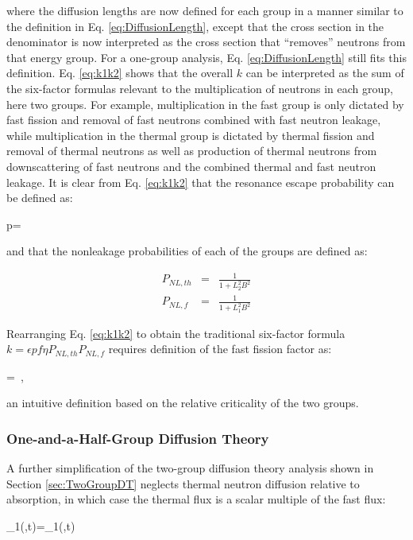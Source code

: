 where the diffusion lengths are now defined for each group in a manner similar to the definition in Eq. \eqref{eq:DiffusionLength}, except that the cross section in the denominator is now interpreted as the cross section that ``removes'' neutrons from that energy group. For a one-group analysis, Eq. \eqref{eq:DiffusionLength} still fits this definition. Eq. \eqref{eq:k1k2} shows that the overall \(k\) can be interpreted as the sum of the six-factor formulas relevant to the multiplication of neutrons in each group, here two groups. For example, multiplication in the fast group is only dictated by fast fission and removal of fast neutrons combined with fast neutron leakage, while multiplication in the thermal group is dictated by thermal fission and removal of thermal neutrons as well as production of thermal neutrons from downscattering of fast neutrons and the combined thermal and fast neutron leakage. It is clear from Eq. \eqref{eq:k1k2} that the resonance escape probability can be defined as:

\beq
p=
\eeq

and that the nonleakage probabilities of each of the groups are defined as:

\begin{subequations}
\begin{eqnarray}
P_{NL,th}&=&\frac{1}{1+L_2^2B^2}\\
P_{NL,f}&=&\frac{1}{1+L_1^2B^2}
\end{eqnarray}
\end{subequations}

Rearranging Eq. \eqref{eq:k1k2} to obtain the traditional six-factor formula \(k=\epsilon pf\eta P_{NL,th}P_{NL,f}\) requires definition of the fast fission factor as:

\beq
\epsilon=\ ,
\eeq

an intuitive definition based on the relative criticality of the two groups.

\subsubsection{One-and-a-Half-Group Diffusion Theory}

A further simplification of the two-group diffusion theory analysis shown in Section \ref{sec:TwoGroupDT} neglects thermal neutron diffusion relative to absorption, in which case the thermal flux is a scalar multiple of the fast flux:

\beq
\phi_1(,t)=\phi_1(,t)
\eeq

